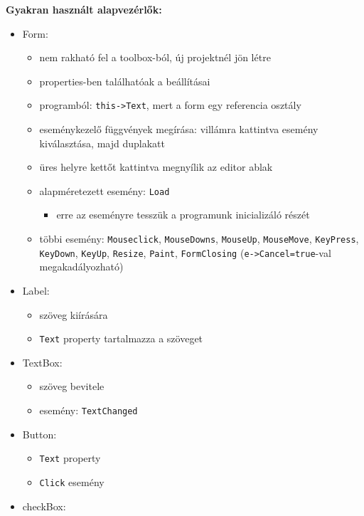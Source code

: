 \textbf{Gyakran használt alapvezérlők:}
\begin{itemize}
    \item Form:
    \begin{itemize}
        \item nem rakható fel a toolbox-ból, új projektnél jön létre
        \item properties-ben találhatóak a beállításai
        \item programból: \texttt{this->Text}, mert a form egy referencia osztály
        \item eseménykezelő függvények megírása: villámra kattintva esemény kiválasztása, majd duplakatt
        \item üres helyre kettőt kattintva megnyílik az editor ablak
        \item alapméretezett esemény: \texttt{Load}
        \begin{itemize}
            \item erre az eseményre tesszük a programunk inicializáló részét
        \end{itemize}
        \item többi esemény: \texttt{Mouseclick}, \texttt{MouseDowns}, \texttt{MouseUp}, \texttt{MouseMove}, \texttt{KeyPress}, \texttt{KeyDown}, \texttt{KeyUp}, \texttt{Resize}, \texttt{Paint}, \texttt{FormClosing} (\texttt{e->Cancel=true}-val megakadályozható)
    \end{itemize}
    \item Label:
    \begin{itemize}
        \item szöveg kiírására
        \item \texttt{Text} property tartalmazza a szöveget
    \end{itemize}
    \item TextBox:
    \begin{itemize}
        \item szöveg bevitele
        \item esemény: \texttt{TextChanged}
    \end{itemize}
    \item Button:
    \begin{itemize}
        \item \texttt{Text} property
        \item \texttt{Click} esemény
    \end{itemize}
    \item checkBox:
    \begin{itemize}

\end{itemize}
\end{itemize}
